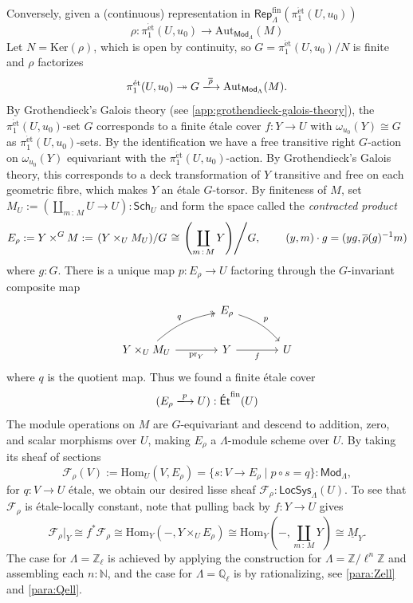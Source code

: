 \documentclass[11pt,letterpaper]{article}
\theoremstyle{numberfirstplain}
\numberwithin{equation}{theorem}
\theoremstyle{numberfirstupright}
\begin{document}
Conversely, given a (continuous) representation in $\mathsf{Rep}^{\mathrm{fin}}_{\Lambda}(\pi_1^{\mathrm{\acute{e}t}}(U,u_0))$
$$\rho:\pi_1^{\mathrm{\acute{e}t}}(U,u_0)\rightarrow\mathrm{Aut}_{\mathsf{Mod}_{\Lambda}}(M)$$
Let $N=\mathrm{Ker}(\rho)$, which is open by continuity, so $G=\pi_1^{\mathrm{\acute{e}t}}(U,u_0)/N$ is finite and $\rho$ factorizes
$$\pi_1^{\mathrm{\acute{e}t}}(U,u_0)\twoheadrightarrow G\xlongrightarrow{\overline{\rho}}\mathrm{Aut}_{\mathsf{Mod}_{\Lambda}}(M).$$
By Grothendieck's Galois theory (see \cref{app:grothendieck-galois-theory}), the $\pi_1^{\mathrm{\acute{e}t}}(U,u_0)$-set $G$ corresponds to a finite étale cover $f:Y\rightarrow U$ with $\omega_{u_0}(Y)\cong G$ as $\pi_1^{\mathrm{\acute{e}t}}(U,u_0)$-sets. 
By the identification we have a free transitive right $G$-action on $\omega_{u_0}(Y)$ equivariant with the $\pi_1^{\mathrm{\acute{e}t}}(U,u_0)$-action. 
By Grothendieck's Galois theory, this corresponds to a deck transformation of $Y$ transitive and free on each geometric fibre, which makes $Y$ an étale $G$-torsor. 
By finiteness of $M$, set $M_U:=(\coprod_{m\,:\, M}U\rightarrow U):\mathsf{Sch}_U$ and form the space called the \textit{contracted product}
$$E_{\rho}:=Y\times^G M:=\left.\left(Y\times_U M_U\right)\middle/G\right.\cong\left.\left(\coprod_{m\,:\, M}Y\right)\middle/G,\right.\qquad (y,m)\cdot g=(yg,\overline{\rho}(g)^{-1}m)$$ 
where $g:G$. 
There is a unique map $p:E_{\rho}\rightarrow U$ factoring through the $G$-invariant composite map
\[
\begin{tikzcd}[column sep=large, row sep=1.8em]
  & E_\rho \arrow[dr, "p", bend left=15] & \\
  Y\times_U M_U \arrow[ur, two heads, "q", bend left=15]
    \arrow[r, "\mathrm{pr}_Y"'] & Y \arrow[r, "f"'] & U
\end{tikzcd}
\]
where $q$ is the quotient map. Thus we found a finite étale cover 
$$(E_\rho\xlongrightarrow{p}U):\mathsf{\acute{E}t}^{\mathrm{fin}}(U)$$
The module operations on $M$ are $G$-equivariant and descend to addition, zero, and scalar morphisms over $U$, making $E_\rho$ a $\Lambda$-module scheme over $U$.
By taking its sheaf of sections 
$$\mathcal F_{\rho}(V):=\mathrm{Hom}_U(V,E_{\rho})=\{s:V\rightarrow E_{\rho}\mid p\circ s=q\}:\mathsf{Mod}_{\Lambda},$$
for $q:V\rightarrow U$ étale, we obtain our desired lisse sheaf $\mathcal F_\rho:\mathsf{LocSys}_{\Lambda}(U)$. 
To see that $\mathcal F_\rho$ is étale-locally constant, note that pulling back by $f:Y\rightarrow U$ gives
$$\mathcal F_\rho|_Y\cong f^*\mathcal F_\rho\cong\mathrm{Hom}_Y(-,Y\times_U E_\rho)\cong\mathrm{Hom}_Y\left(-,\coprod_{m\,:\,M}Y\right)\cong\underline{M}_Y.$$
The case for $\Lambda=\mathbb Z_\ell$ is achieved by applying the construction for $\Lambda=\mathbb Z/\ell^n\mathbb Z$ and assembling each $n:\mathbb N$, and the case for $\Lambda=\mathbb Q_\ell$ is by rationalizing, see \cref{para:Zell} and \cref{para:Qell}.
\end{document}
